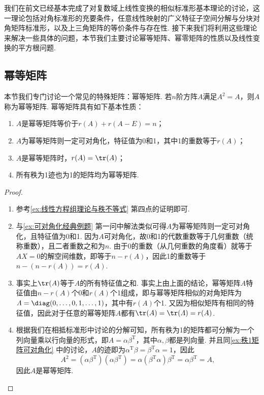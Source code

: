 我们在前文已经基本完成了对复数域上线性变换的相似标准形基本理论的讨论，这一理论包括对角标准形的充要条件，任意线性映射的广义特征子空间分解与分块对角矩阵标准形，以及上三角矩阵的等价条件与存在性. 接下来我们将利用这些理论来解决一些具体的问题，本节我们主要讨论幂等矩阵、幂零矩阵的性质以及线性变换的平方根问题.

\subsection{幂等矩阵}

本节我们专门讨论一个常见的特殊矩阵：幂等矩阵. 若$n$阶方阵$A$满足$A^2=A$，则$A$称为幂等矩阵. 幂等矩阵具有如下基本性质：
\begin{enumerate}
    \item $A$是幂等矩阵等价于$r(A)+r(A-E)=n$；

    \item $A$为幂等矩阵则一定可对角化，特征值为0和1，其中1的重数等于$r(A)$；

    \item $A$是幂等矩阵时，$r(A)=\tr(A)$；

    \item 所有秩为1迹也为1的矩阵均为幂等矩阵.
\end{enumerate}

\begin{proof}
    \begin{enumerate}
        \item 参考\autoref{ex:线性方程组理论与秩不等式} 第四点的证明即可.

        \item 与\autoref{ex:可对角化经典例题} 第一问中解法类似可得$A$为幂等矩阵则一定可对角化，且特征值为0和1. 因为$A$可对角化，故0和1的代数重数等于几何重数（统称重数），且二者重数之和为$n$. 由于0的重数（从几何重数的角度看）就等于$AX=0$的解空间维数，即等于$n-r(A)$，因此1的重数等于$n-(n-r(A))=r(A)$.

        \item 事实上$\tr(A)$等于$A$的所有特征值之和. 事实上由上面的结论，幂等矩阵$A$特征值由$n-r(A)$个0和$r(A)$个1组成，即与幂等矩阵相似的对角矩阵为$\varLambda=\diag(0,\ldots,0,1,\ldots,1)$，其中有$r(A)$个1. 又因为相似矩阵有相同的特征值，因此对于任意的幂等矩阵$A$都有$\tr(A)=\tr(\varLambda)=r(A)$.

        \item 根据我们在相抵标准形中讨论的分解可知，所有秩为1的矩阵都可分解为一个列向量乘以行向量的形式，即$A=\alpha\beta^\mathrm{T}$，其中$\alpha,\beta$都是列向量. 并且同\autoref{ex:秩1矩阵可对角化} 中的讨论，$A$的迹即为$\alpha^\mathrm{T}\beta=\beta^\mathrm{T}\alpha=1$，因此
              \[A^2=(\alpha\beta^\mathrm{T})(\alpha\beta^\mathrm{T})=\alpha(\beta^\mathrm{T}\alpha)\beta^\mathrm{T}=\alpha\beta^\mathrm{T}=A,\]
              因此$A$是幂等矩阵.
    \end{enumerate}
\end{proof}

